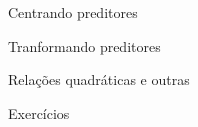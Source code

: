 \documentclass[
  9pt,
  ignorenonframetext,
  aspectratio=169]{beamer}
\begin{document}
\begin{frame}{Centrando preditores}
\protect\hypertarget{centrando-preditores}{}
\end{frame}

\begin{frame}{Tranformando preditores}
\protect\hypertarget{tranformando-preditores}{}
\end{frame}

\begin{frame}{Relações quadráticas e outras}
\protect\hypertarget{relauxe7uxf5es-quadruxe1ticas-e-outras}{}
\end{frame}

\begin{frame}{Exercícios}
\protect\hypertarget{exercuxedcios}{}
\end{frame}
\end{document}
